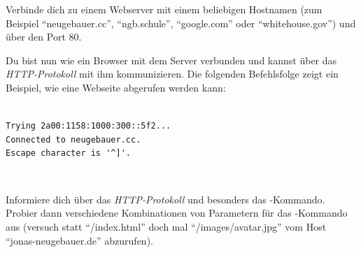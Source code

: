 \documentclass[10pt, a4paper]{arbeitsblatt}
\begin{document}
\newpage

\begin{aufgabe}[icon=\iconComputer]
Verbinde dich zu einem Webserver mit einem beliebigen Hostnamen (zum Beispiel \enquote{neugebauer.cc}, \enquote{ngb.schule}, \enquote{google.com} oder \enquote{whitehouse.gov}) und über den Port 80.

Du bist nun wie ein Browser mit dem Server verbunden und kannst über das \emph{HTTP-Protokoll} mit ihm kommunizieren. Die folgenden Befehlsfolge zeigt ein Beispiel, wie eine Webseite abgerufen werden kann:

\textbf{}\\
{\color{gray}
\verb|Trying 2a00:1158:1000:300::5f2...| \\
\verb|Connected to neugebauer.cc.|\\
\verb|Escape character is '^]'.|
}

\textbf{} \\
\textbf{}

Informiere dich über das \emph{HTTP-Protokoll} und besonders das -Kommando. Probier dann verschiedene Kombinationen von Parametern für das -Kommando aus (versuch statt \enquote{/index.html} doch mal \enquote{/images/avatar.jpg} vom Host \enquote{jonas-neugebauer.de} abzurufen).
\end{aufgabe}
\end{document}
